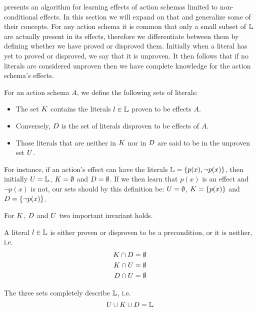 \documentclass[../Master.tex]{subfiles}
\begin{document}
\cite{Walsh2008} presents an algorithm for learning effects of action schemas limited to non-conditional effects. In this section we will expand on that and generalize some of their concepts.
For any action schema it is common that only a small subset of $\mathbb{L}$ are actually present in its effects, 
therefore we differentiate between them by defining whether we have proved or disproved them. 
Initially when a literal has yet to proved or disproved, we say that it is unproven. 
It then follows that if no literals are considered unproven then we have complete knowledge for the action schema's effects.


\begin{definition} 
	For an action schema $A$, we define the following sets of literals:
	\begin{itemize}
		\item The set $K$ contains the literals  $l \in \mathbb{L}$ proven to be effects $A$.
		\item Conversely, $D$ is the set of literals disproven to be effects of $A$.
		\item Those literals that are neither in $K$ nor in $D$ are said to be in the unproven set $U$.
	\end{itemize}
	For instance, if an action's effect can have the literals $\mathbb{L} = \{p(x), \neg p(x)\}$, 
	then initially $U = \mathbb{L}$, $K = \emptyset$ and $D = \emptyset$. 
	If we then learn that $p(x)$ is an effect and $\neg p(x)$ is not, 
	our sets should by this definition be: $U = \emptyset$, $K = \{p(x)\}$ and $D = \{\neg p(x)\}$. 
	
\end{definition}

For $K$, $D$ and $U$ two important invariant holds.

\begin{invariant}\label{inv:nca:mutual-ex}
	A literal $l \in \mathbb{L}$ is either proven or disproven to be a precondition, or it is neither, i.e.\
	\begin{equation*}
	\begin{split}
	K \cap D & = \emptyset  \\ 
	K \cap U &= \emptyset \\
	D \cap U &= \emptyset
	\end{split}
	\end{equation*}
\end{invariant}

\begin{invariant}[Completeness]\label{inv:nca:completeness}
	The three sets completely describe $\mathbb{L}$, i.e.\ 
	\begin{equation*}
	U \cup K \cup D = \mathbb{L}
	\end{equation*}
\end{invariant}
\end{document}
